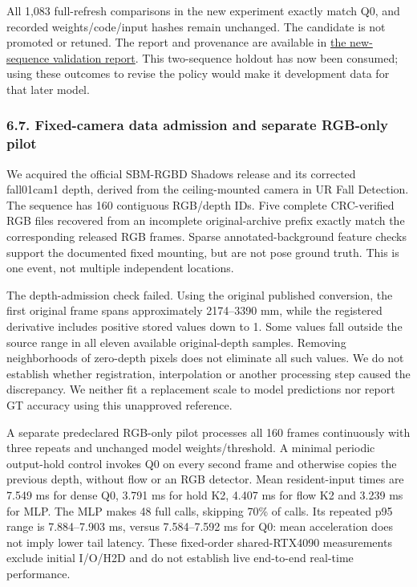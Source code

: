 \documentclass[
  10pt,
]{article}
\begin{document}
All 1,083 full-refresh comparisons in the new experiment exactly match
Q0, and recorded weights/code/input hashes remain unchanged. The
candidate is not promoted or retuned. The report and provenance are
available in \href{streaming_draft/INDEPENDENT_VALIDATION.md}{the
new-sequence validation report}. This two-sequence holdout has now been
consumed; using these outcomes to revise the policy would make it
development data for that later model.

\subsubsection{6.7. Fixed-camera data admission and separate RGB-only
pilot}\label{fixed-camera-data-admission-and-separate-rgb-only-pilot}

We acquired the official SBM-RGBD Shadows release and its corrected
fall01cam1 depth, derived from the ceiling-mounted camera in UR Fall
Detection. The sequence has 160 contiguous RGB/depth IDs. Five complete
CRC-verified RGB files recovered from an incomplete original-archive
prefix exactly match the corresponding released RGB frames. Sparse
annotated-background feature checks support the documented fixed
mounting, but are not pose ground truth. This is one event, not multiple
independent locations.

The depth-admission check failed. Using the original published
conversion, the first original frame spans approximately 2174--3390 mm,
while the registered derivative includes positive stored values down to
1. Some values fall outside the source range in all eleven available
original-depth samples. Removing neighborhoods of zero-depth pixels does
not eliminate all such values. We do not establish whether registration,
interpolation or another processing step caused the discrepancy. We
neither fit a replacement scale to model predictions nor report GT
accuracy using this unapproved reference.

A separate predeclared RGB-only pilot processes all 160 frames
continuously with three repeats and unchanged model weights/threshold. A
minimal periodic output-hold control invokes Q0 on every second frame
and otherwise copies the previous depth, without flow or an RGB
detector. Mean resident-input times are 7.549 ms for dense Q0, 3.791 ms
for hold K2, 4.407 ms for flow K2 and 3.239 ms for MLP. The MLP makes 48
full calls, skipping 70\% of calls. Its repeated p95 range is
7.884--7.903 ms, versus 7.584--7.592 ms for Q0: mean acceleration does
not imply lower tail latency. These fixed-order shared-RTX4090
measurements exclude initial I/O/H2D and do not establish live
end-to-end real-time performance.
\end{document}
